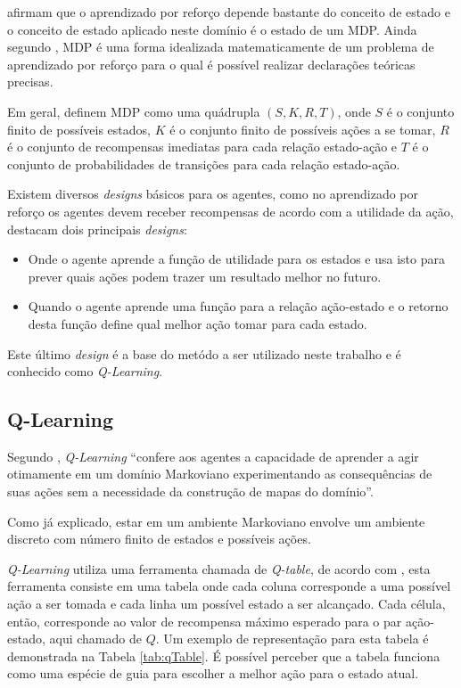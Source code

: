  afirmam que o aprendizado por reforço depende bastante do
conceito de estado e o conceito de estado aplicado neste domínio é o estado de um MDP. Ainda segundo
, MDP é uma forma idealizada matematicamente de um problema de
aprendizado por reforço para o qual é possível realizar declarações teóricas precisas.

Em geral,  definem MDP como uma quádrupla $(S, K, R, T)$, onde $S$ é o
conjunto finito de possíveis estados, $K$ é o conjunto finito de possíveis ações a se tomar, $R$ é o
conjunto de recompensas imediatas para cada relação estado-ação e $T$ é o conjunto de probabilidades
de transições para cada relação estado-ação. 

Existem diversos \textit{designs} básicos para os agentes, como no aprendizado por reforço os
agentes devem receber recompensas de acordo com a utilidade da ação,
 destacam dois principais \textit{designs}:

\begin{itemize}
    \item Onde o agente aprende a função de utilidade para os estados e usa isto para prever quais
    ações podem trazer um resultado melhor no futuro.
    
    \item Quando o agente aprende uma função para a relação ação-estado e o retorno desta função
    define qual melhor ação tomar para cada estado.
\end{itemize}

Este último \textit{design} é a base do metódo a ser utilizado neste trabalho e é conhecido como
\textit{Q-Learning}.

\subsection{Q-Learning}\label{qlearning}

Segundo , \textit{Q-Learning} ``confere aos agentes a capacidade de
aprender a agir otimamente em um domínio Markoviano experimentando as consequências de suas ações
sem a necessidade da construção de mapas do domínio''.

Como já explicado, estar em um ambiente Markoviano envolve um ambiente discreto com número finito de
estados e possíveis ações.

\textit{Q-Learning} utiliza uma ferramenta chamada de \textit{Q-table}, de acordo com
, esta ferramenta consiste em uma tabela onde cada coluna corresponde a
uma possível ação a ser tomada e cada linha um possível estado a ser alcançado. Cada célula, então,
corresponde ao valor de recompensa máximo esperado para o par ação-estado, aqui chamado de $Q$. Um
exemplo de representação para esta tabela é demonstrada na Tabela \ref{tab:qTable}. É possível
perceber que a tabela funciona como uma espécie de guia para escolher a melhor ação para o estado
atual.

